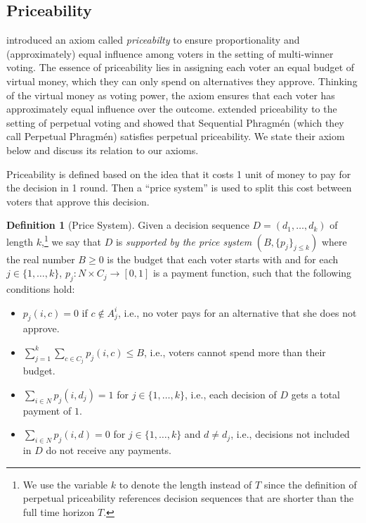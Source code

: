 \documentclass[10pt]{scrartcl}
\theoremstyle{plain}
\theoremstyle{definition}
\newtheorem{definition}[theorem]{Definition}
\renewcommand*{\le}{\leqslant}
\renewcommand*{\leq}{\leqslant}
\renewcommand*{\ge}{\geqslant}
\begin{document}
\subsection{Priceability}
\label{app:priceability}

\citet{PeSk20} introduced an axiom called \emph{priceabilty} to ensure proportionality and (approximately) equal influence among voters in the setting of multi-winner voting. The essence of priceability lies in assigning each voter an equal budget of virtual money, which they can only spend on alternatives they approve. Thinking of the virtual money as voting power, the axiom ensures that each voter has approximately equal influence over the outcome. \citet{lacknermaly2023} extended priceability to the setting of perpetual voting and showed that Sequential Phragm\'en (which they call Perpetual Phragm\'en) satisfies perpetual priceability. We state their axiom below and discuss its relation to our axioms. 



Priceability is defined based on the idea that it costs 1 unit of money to pay for the decision in 1 round. Then a ``price system'' is used to split this cost between voters that approve this decision.

\begin{definition} [Price System]
\label{def:price_system}
Given a decision sequence $D = (d_1, \ldots, d_k)$ of length $k$,\footnote{We use the variable $k$ to denote the length instead of $T$ since the definition of perpetual priceability references decision sequences that are shorter than the full time horizon $T$.}
we say that $D$ is \emph{supported by the price system} $(B,\{p_j\}_{j \leq k})$ where the real number $B\ge 0$ is the budget that each voter starts with and for each $j \in \{1, \ldots, k\}$, $p_j : N \times C_j \to [0,1]$ is a payment function, such that the following conditions hold:
\begin{itemize}[leftmargin=30pt]
    \item [(P1)] $p_j(i, c)=0$ if $c \notin A^i_j$, i.e., no voter pays for an alternative that she does not approve.
    \item [(P2)] $\sum_{j=1}^k \sum_{c \in C_j} p_j(i, c) \le B$, i.e., voters cannot spend more than their budget.
    \item [(P3)] $\sum_{i \in N} p_j(i, d_j)=1$ for $j \in\{1, \ldots, k\}$, i.e., each decision of $D$ gets a total payment of $1$.
    \item [(P4)] $\sum_{i \in N} p_j(i, d)=0$ for $j \in\{1, \ldots, k\}$ and $d \neq d_j$, i.e., decisions not included in $D$ do not receive any payments.
\end{itemize}
\end{definition}
\end{document}
